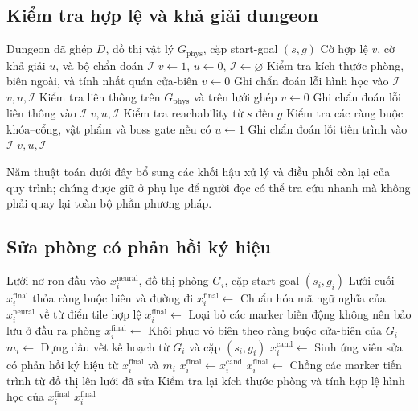 \documentclass[oneside,a4paper,12pt]{extreport}
\begin{document}
\subsection{Kiểm tra hợp lệ và khả giải dungeon}
\begin{algorithm}[H]
\caption{Kiểm tra hợp lệ và khả giải dungeon trước khi đưa vào kho lưu trữ}
\label{alg:dungeon_validity_solvability}
\begin{algorithmic}[1]
\Require Dungeon đã ghép $D$, đồ thị vật lý $G_{\mathrm{phys}}$, cặp start-goal $(s,g)$
\Ensure Cờ hợp lệ $v$, cờ khả giải $u$, và bộ chẩn đoán $\mathcal{I}$
\State $v \gets 1$, $u \gets 0$, $\mathcal{I} \gets \varnothing$
\State Kiểm tra kích thước phòng, biên ngoài, và tính nhất quán cửa-biên
  \State $v \gets 0$
  \State Ghi chẩn đoán lỗi hình học vào $\mathcal{I}$
  \State \Return $v,u,\mathcal{I}$
\EndIf
\State Kiểm tra liên thông trên $G_{\mathrm{phys}}$ và trên lưới ghép
  \State $v \gets 0$
  \State Ghi chẩn đoán lỗi liên thông vào $\mathcal{I}$
  \State \Return $v,u,\mathcal{I}$
\EndIf
\State Kiểm tra reachability từ $s$ đến $g$
\State Kiểm tra các ràng buộc khóa--cổng, vật phẩm và boss gate nếu có
  \State $u \gets 1$
\Else
  \State Ghi chẩn đoán lỗi tiến trình vào $\mathcal{I}$
\EndIf
\State \Return $v,u,\mathcal{I}$
\end{algorithmic}
\end{algorithm}

Năm thuật toán dưới đây bổ sung các khối hậu xử lý và điều phối còn lại của quy trình; chúng được giữ ở phụ lục để người đọc có thể tra cứu nhanh mà không phải quay lại toàn bộ phần phương pháp.

\subsection{Sửa phòng có phản hồi ký hiệu}
\begin{algorithm}[H]
\caption{Sửa phòng có phản hồi ký hiệu ở tầng hậu xử lý}
\label{alg:app_room_repair_feedback}
\begin{algorithmic}[1]
\Require Lưới nơ-ron đầu vào $x_i^{\text{neural}}$, đồ thị phòng $G_i$, cặp start-goal $(s_i,g_i)$
\Ensure Lưới cuối $x_i^{\text{final}}$ thỏa ràng buộc biên và đường đi
\State $x_i^{\text{final}} \gets$ Chuẩn hóa mã ngữ nghĩa của $x_i^{\text{neural}}$ về từ điển tile hợp lệ
\State $x_i^{\text{final}} \gets$ Loại bỏ các marker biến động không nên bảo lưu ở đầu ra phòng
\State $x_i^{\text{final}} \gets$ Khôi phục vỏ biên theo ràng buộc cửa-biên của $G_i$
\State $m_i \gets$ Dựng dấu vết kế hoạch từ $G_i$ và cặp $(s_i,g_i)$
  \State $x_i^{\text{cand}} \gets$ Sinh ứng viên sửa có phản hồi ký hiệu từ $x_i^{\text{final}}$ và $m_i$
    \State $x_i^{\text{final}} \gets x_i^{\text{cand}}$
  \EndIf
\EndIf
\State $x_i^{\text{final}} \gets$ Chồng các marker tiến trình từ đồ thị lên lưới đã sửa
\State Kiểm tra lại kích thước phòng và tính hợp lệ hình học của $x_i^{\text{final}}$
\State \Return $x_i^{\text{final}}$
\end{algorithmic}
\end{algorithm}
\end{document}
